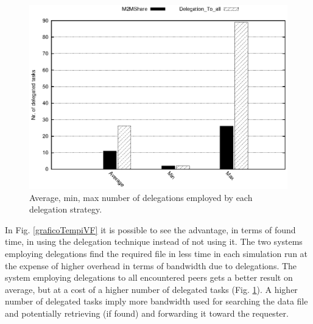 \begin{figure}[ht]
\centering
\includegraphics[scale=0.7]{grafici/delegheFatte.eps}
\caption{Average, min, max number of delegations employed by each delegation strategy.}
\label{graficoNumeroDeleghe}
\end{figure}



In Fig. \ref{graficoTempiVF} it is possible to see the advantage, in terms of found time, in using the delegation technique instead of not using it. The two systems employing delegations find the required file in less time in each simulation run at the expense of higher overhead in terms of bandwidth due to delegations. The system employing delegations to all encountered peers gets a better result on average, but at a cost of a higher number of delegated tasks (Fig. \ref{graficoNumeroDeleghe}). A higher number of delegated tasks imply more bandwidth used for searching the data file and potentially retrieving (if found) and forwarding it toward the requester.
\\

